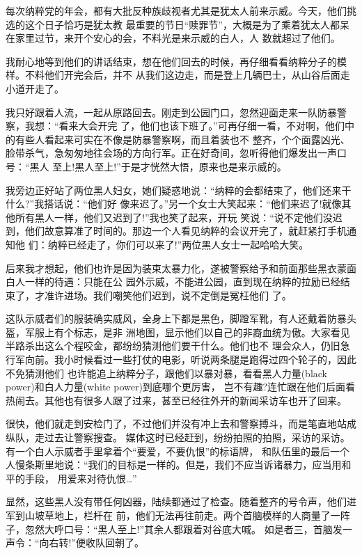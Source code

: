﻿\documentclass[11pt]{article}
\begin{document}
每次纳粹党的年会，都有大批反种族歧视者尤其是犹太人前来示威。今天，他们挑选的这个日子恰巧是犹太教
最重要的节日``赎罪节''，大概是为了乘着犹太人都呆在家里过节，来开个安心的会，不料光是来示威的白人，人
数就超过了他们。

我耐心地等到他们的讲话结束，想在他们回去的时候，再仔细看看纳粹分子的模样。不料他们开完会后，并不
从我们这边走，而是登上几辆巴士，从山谷后面走小道开走了。

我只好跟着人流，一起从原路回去。刚走到公园门口，忽然迎面走来一队防暴警察，我想：``看来大会开完
了，他们也该下班了。''可再仔细一看，不对啊，他们中的有些人看起来可实在不像是防暴警察啊，而且着装也不
整齐，个个面露凶光、脸带杀气，急匆匆地往会场的方向行军。正在好奇间，忽听得他们爆发出一声口号：``黑人
至上!黑人至上!''于是才恍然大悟，原来也是来示威的。

我旁边正好站了两位黑人妇女，她们疑惑地说：``纳粹的会都结束了，他们还来干什么?''我搭话说：``他们好
像来迟了。''另一个女士大笑起来：``他们来迟了!就像其他所有黑人一样，他们又迟到了!''我也笑了起来，开玩
笑说：``说不定他们没迟到，他们故意算准了时间的。那边一个人看见纳粹的会议开完了，就赶紧打手机通知他
们：纳粹已经走了，你们可以来了!''两位黑人女士一起哈哈大笑。

后来我才想起，他们也许是因为装束太暴力化，遂被警察给予和前面那些黑衣蒙面白人一样的待遇：只能在公
园外示威，不能进公园，直到现在纳粹的拉励已经结束了，才准许进场。我们嘲笑他们迟到，说不定倒是冤枉他们
了。

这队示威者们的服装确实威风，全身上下都是黑色，脚蹬军靴，有人还戴着防暴头盔，军服上有个标志，是非
洲地图，显示他们以自己的非裔血统为傲。大家看见半路杀出这么个程咬金，都纷纷猜测他们要干什么。他们也不
理会众人，仍旧急行军向前。我小时候看过一些打仗的电影，听说两条腿是跑得过四个轮子的，因此不免猜测他们
也许能追上纳粹分子，跟他们以暴对暴，看看黑人力量(black power)和白人力量(white power)到底哪个更厉害，
岂不有趣?连忙跟在他们后面看热闹去。其他也有很多人跟了过来，甚至已经往外开的新闻采访车也开了回来。


很快，他们就走到安检门了，不过他们并没有冲上去和警察搏斗，而是笔直地站成纵队，走过去让警察搜查。
媒体这时已经赶到，纷纷拍照的拍照，采访的采访。有一个白人示威者手里拿着个``要爱，不要仇恨''的标语牌，
和队伍里的最后一个人慢条斯里地说：``我们的目标是一样的。但是，我们不应当诉诸暴力，应当用和平的手段，
用爱来对待仇恨\ldots ''

显然，这些黑人没有带任何凶器，陆续都通过了检查。随着整齐的号令声，他们进军到山坡草地上，栏杆在
前，他们无法再往前走。两个首脑模样的人商量了一阵子，忽然大呼口号：``黑人至上!''其余人都跟着对谷底大喊。
如是者三，首脑发一声令：``向右转!''便收队回朝了。
\end{document}
